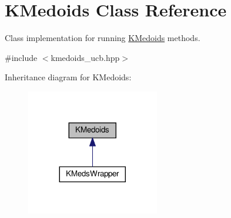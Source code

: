 \hypertarget{classKMedoids}{}\section{K\+Medoids Class Reference}
\label{classKMedoids}


Class implementation for running \hyperlink{classKMedoids}{K\+Medoids} methods.  




{\ttfamily \#include $<$kmedoids\+\_\+ucb.\+hpp$>$}



Inheritance diagram for K\+Medoids\+:\nopagebreak
\begin{figure}[H]
\begin{center}
\leavevmode
\includegraphics[width=164pt]{classKMedoids__inherit__graph}
\end{center}
\end{figure}
